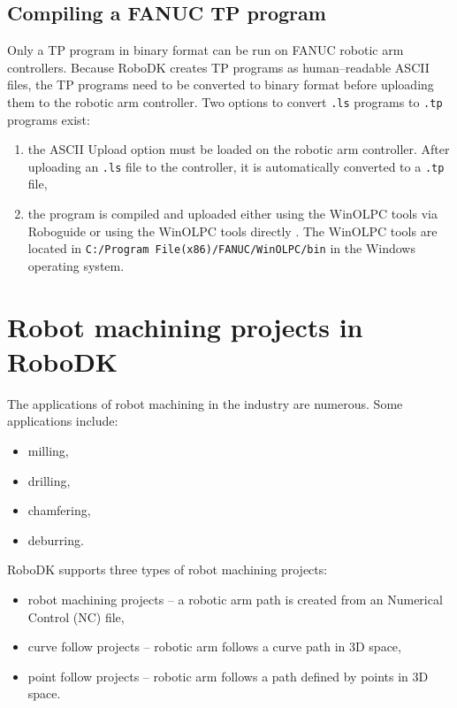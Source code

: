 \subsection{Compiling a FANUC TP program}

Only a TP program in binary format can be run on FANUC robotic arm controllers. Because RoboDK creates TP programs as human--readable ASCII files, the TP programs need to be converted to binary format before uploading them to the robotic arm controller. Two options to convert \texttt{.ls} programs to \texttt{.tp} programs exist:

\begin{enumerate}
\item the ASCII Upload option must be loaded on the robotic arm controller. After uploading an \texttt{.ls} file to the controller, it is automatically converted to a \texttt{.tp} file,
\item the program is compiled and uploaded either using the WinOLPC  tools via Roboguide or using the WinOLPC tools directly \cite{fanuchandling}. The WinOLPC tools are located in \texttt{C:/Program File(x86)/FANUC/WinOLPC/bin} in the Windows operating system.

\end{enumerate}

\section{Robot machining projects in RoboDK}

The applications of robot machining in the industry are numerous. Some applications include:

\begin{itemize}

    \item milling,
    \item drilling,
    \item chamfering,
    \item deburring.

\end{itemize}

RoboDK supports three types of robot machining projects:

\begin{itemize}

    \item robot machining projects -- a robotic arm path is created from an Numerical Control (NC) file,
    \item curve follow projects -- robotic arm follows a curve path in 3D space, 
    \item point follow projects -- robotic arm follows a path defined by points in 3D space.

\end{itemize}

